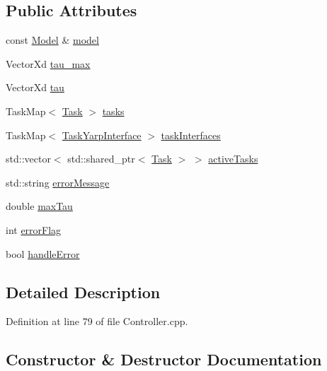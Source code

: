 \subsection*{Public Attributes}
\begin{DoxyCompactItemize}
\item 
const \hyperlink{classocra_1_1Model}{Model} \& \hyperlink{structocra_1_1Controller_1_1Pimpl_aadf5eccdc9453d1f277f62b7becf7390}{model}
\item 
Vector\+Xd \hyperlink{structocra_1_1Controller_1_1Pimpl_a19486bfe59a11231eeabfd3b2b9abd39}{tau\+\_\+max}
\item 
Vector\+Xd \hyperlink{structocra_1_1Controller_1_1Pimpl_a06e7fceb4a0a3c678a4e26fc12946e5c}{tau}
\item 
Task\+Map$<$ \hyperlink{classocra_1_1Task}{Task} $>$ \hyperlink{structocra_1_1Controller_1_1Pimpl_a246fa1cc15ad20293ef78b04dc0dbe70}{tasks}
\item 
Task\+Map$<$ \hyperlink{classocra_1_1TaskYarpInterface}{Task\+Yarp\+Interface} $>$ \hyperlink{structocra_1_1Controller_1_1Pimpl_a396836991948d8d90cf5852330d2c5c3}{task\+Interfaces}
\item 
std\+::vector$<$ std\+::shared\+\_\+ptr$<$ \hyperlink{classocra_1_1Task}{Task} $>$ $>$ \hyperlink{structocra_1_1Controller_1_1Pimpl_a721a40c7b21e230a7508995ecfa93d60}{active\+Tasks}
\item 
std\+::string \hyperlink{structocra_1_1Controller_1_1Pimpl_a1150a44bd413ec025703d53c8eaf4733}{error\+Message}
\item 
double \hyperlink{structocra_1_1Controller_1_1Pimpl_a6731e905858ef90305a3c99c605c8069}{max\+Tau}
\item 
int \hyperlink{structocra_1_1Controller_1_1Pimpl_a8a4ac972687499a277fa08dced73180c}{error\+Flag}
\item 
bool \hyperlink{structocra_1_1Controller_1_1Pimpl_a2764f0bf903a983abae8195ab6639ed5}{handle\+Error}
\end{DoxyCompactItemize}


\subsection{Detailed Description}


Definition at line 79 of file Controller.\+cpp.



\subsection{Constructor \& Destructor Documentation}
\hypertarget{structocra_1_1Controller_1_1Pimpl_ad59ee786ca8b100a87e797cdfc6c15f5}{}\label{structocra_1_1Controller_1_1Pimpl_ad59ee786ca8b100a87e797cdfc6c15f5} 
